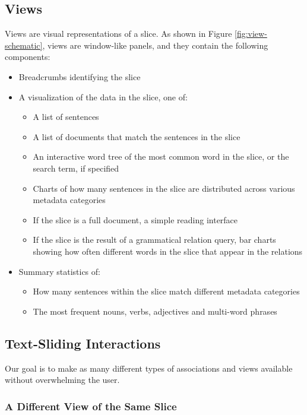 \documentclass{sig-alternate}
\begin{document}
\subsection{Views}
Views are visual representations of a slice. As shown in Figure \ref{fig:view-schematic},  views  are window-like panels, and they contain the following components:
\begin{itemize}
	\item Breadcrumbs identifying the slice
	\item A visualization of the data in the slice, one of:
		\begin{itemize}
			\item A list of sentences
			\item A list of documents that match the sentences in the slice
			\item An interactive word tree \cite{wattenberg_word_2008} of the most common word in the slice, or the search term, if specified
			\item Charts of how many sentences in the slice are distributed across various metadata categories
			\item If the slice is a full document, a simple reading interface
			\item If the slice is the result of a grammatical relation query, bar charts showing how often different words in the slice that appear in the relations
		\end{itemize}
	\item Summary statistics of:
		\begin{itemize}
			\item How many sentences within the slice match different metadata categories
			\item The most frequent nouns, verbs, adjectives and multi-word phrases
		\end{itemize}
\end{itemize}

\subsection{Text-Sliding Interactions}

Our goal is to make as many different types of associations and views available without overwhelming the user.

\subsubsection{A Different View of the Same Slice}
\end{document}
